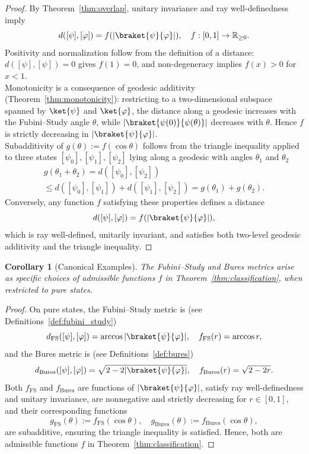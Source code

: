 \documentclass[aps,pra,reprint,nofootinbib,showpacs,superscriptaddress]{revtex4-1}
\newtheorem{corollary}[theorem]{Corollary}
\begin{document}
\begin{proof}
By Theorem~\ref{thm:overlap}, unitary invariance and ray well-definedness imply
\[
d([\psi],[\varphi]) = f(|\braket{\psi}{\varphi}|), \quad f:[0,1]\to\mathbb{R}_{\ge 0}.
\]
Positivity and normalization follow from the definition of a distance: $d([\psi],[\psi]) = 0$ gives $f(1) = 0$, and non-degeneracy implies $f(x) > 0$ for $x < 1$. \\
Monotonicity is a consequence of geodesic additivity (Theorem~\ref{thm:monotonicity}): restricting to a two-dimensional subspace spanned by $\ket{\psi}$ and $\ket{\varphi}$, the distance along a geodesic increases with the Fubini--Study angle $\theta$, while $|\braket{\psi(0)}{\psi(\theta)}|$ decreases with $\theta$. Hence $f$ is strictly decreasing in $|\braket{\psi}{\varphi}|$.\\
Subadditivity of $g(\theta) := f(\cos\theta)$ follows from the triangle inequality applied to three states $[\psi_0],[\psi_1],[\psi_2]$ lying along a geodesic with angles $\theta_1$ and $\theta_2$
\begin{multline}\nonumber 
    g(\theta_1+\theta_2) = d([\psi_0],[\psi_2]) \\
    \le d([\psi_0],[\psi_1]) + d([\psi_1],[\psi_2])
    = g(\theta_1) + g(\theta_2).
\end{multline}
Conversely, any function $f$ satisfying these properties defines a distance
\[
d([\psi],[\varphi]) = f(|\braket{\psi}{\varphi}|),
\]
which is ray well-defined, unitarily invariant, and satisfies both two-level geodesic additivity and the triangle inequality.
\end{proof}


\begin{corollary}[Canonical Examples]
The Fubini--Study and Bures metrics arise as specific choices of admissible functions $f$ in Theorem~\ref{thm:classification}, when restricted to pure states.
\end{corollary}

\begin{proof}
On pure states, the Fubini--Study metric is (see Definitions~\ref{def:fubini_study})  
\[
d_\mathrm{FS}([\psi],[\varphi]) = \arccos|\braket{\psi}{\varphi}|, \quad f_\mathrm{FS}(r) = \arccos r,
\]
and the Bures metric is (see Definitions~\ref{def:bures}) 
\[
d_\mathrm{Bures}([\psi],[\varphi]) = \sqrt{2 - 2|\braket{\psi}{\varphi}|}, \quad f_\mathrm{Bures}(r) = \sqrt{2-2r}.
\]
Both $f_\mathrm{FS}$ and $f_\mathrm{Bures}$ are functions of $|\braket{\psi}{\varphi}|$, satisfy ray well-definedness and unitary invariance, are nonnegative and strictly decreasing for $r \in [0,1]$, and their corresponding functions
\[
g_\mathrm{FS}(\theta) := f_\mathrm{FS}(\cos\theta), \quad g_\mathrm{Bures}(\theta) := f_\mathrm{Bures}(\cos\theta),
\]
are subadditive, ensuring the triangle inequality is satisfied. Hence, both are admissible functions $f$ in Theorem~\ref{thm:classification}.
\end{proof}
\end{document}
